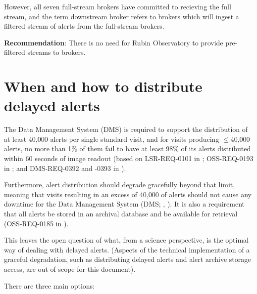 \documentclass[DM,authoryear,toc]{lsstdoc}
\begin{document}
However, all seven full-stream brokers have committed to recieving the full stream, and the term downstream broker refers to 
brokers which will ingest a filtered stream of alerts from the full-stream brokers.

\textbf{Recommendation}: There is no need for Rubin Observatory to provide pre-filtered streams to brokers.


\section{When and how to distribute delayed alerts}\label{sec:delayed}

The Data Management System (DMS) is required to support the distribution of at least 40,000 alerts per single standard visit, and for visits producing $\leq$40,000 alerts, no more than 1\% of them fail to have at least 98\% of its alerts distributed within 60 seconds of image readout (based on LSR-REQ-0101 in ; OSS-REQ-0193 in ; and DMS-REQ-0392 and -0393 in ).

Furthermore, alert distribution should degrade gracefully beyond that limit, meaning that visits resulting in an excess of 40,000 of alerts should not cause any downtime for the Data Management System (DMS; , ).
It is also a requirement that all alerts be stored in an archival database and be available for retrieval (OSS-REQ-0185 in ).

This leaves the open question of what, from a science perspective, is the optimal way of dealing with delayed alerts.
(Aspects of the technical implementation of a graceful degradation, such as distributing delayed alerts and alert archive storage access, are out of scope for this document).

There are three main options:
\end{document}
